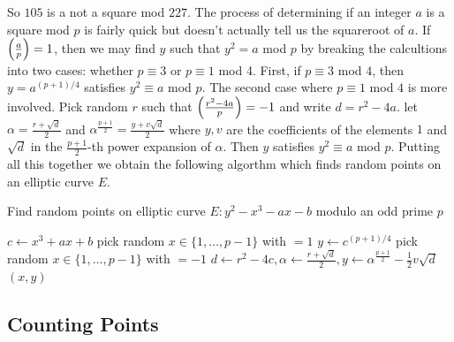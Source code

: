 So $105$ is a not a square mod $227$. The process of determining if an integer $a$ is a square mod $p$ is fairly quick but doesn't actually tell us the squareroot of $a$. If $\left(\frac{a}{p}\right) = 1 $, then we may find $y$ such that $y^2 = a$ mod $p$ by breaking the calcultions into two cases: whether $p \equiv 3$ or $p \equiv 1$ mod 4. First, if $p \equiv 3 $ mod $4$, then $y = a^{(p+1)/4}$ satisfies $y^2 \equiv a $ mod $p$. The second case where $p \equiv 1 $ mod $4$ is more involved. Pick random $r$ such that $\left(\frac{r^2 - 4a}{p}\right) =  -1 $ and write $d = r^2 - 4a$. let $\alpha = \frac{r+\sqrt{d}}{2}$ and $\alpha^{\frac{p+1}{2}} = \frac{y + v \sqrt{d}}{2}$ where $y,v$ are the coefficients of the elements $1$ and $\sqrt{d}$ in the $\frac{p+1}{2}$-th power expansion of $\alpha$. Then $y$ satisfies $y^2 \equiv a $ mod $p$. Putting all this together we obtain the following algorthm which finds random points on an elliptic curve $E$. 
\begin{algorithm} 
	\caption{Find random points on elliptic curve $E : y^2 - x^3 - ax - b$ modulo an odd prime $p$ }
	\begin{algorithmic}[1]
			\State $c \leftarrow x^3 + ax + b$ 
			\State pick random $x \in \lbrace 1, \dots , p-1 \rbrace $ with  $= 1$ 
				\State $y \leftarrow c^{(p+1)/4}$
			\Else
				\State pick random $x \in \lbrace 1, \dots , p-1 \rbrace $ with  $= - 1$
				\State $d \leftarrow r^2 - 4c, \alpha \leftarrow \frac{r+\sqrt{d}}{2}, y \leftarrow  \alpha^{\frac{p+1}{2}} - \frac{1}{2} v\sqrt{d}$
			\EndIf
			\State \Return $(x,y)$
	  	\EndFunction
	\end{algorithmic} 
\end{algorithm} 


\subsection{Counting Points}

